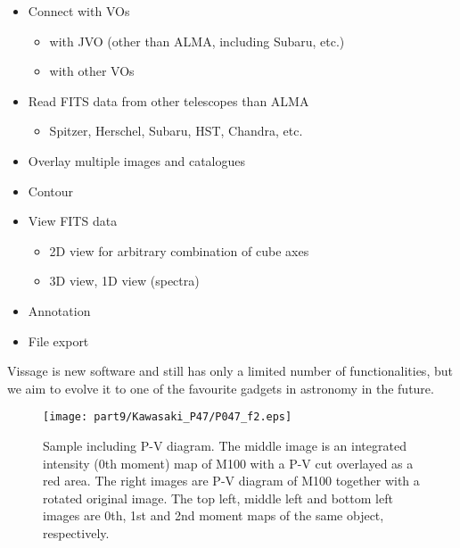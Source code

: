 \begin{itemize}
  \item Connect with VOs
    \begin{itemize}
      \item with JVO (other than ALMA, including Subaru, etc.)
      \item with other VOs
    \end{itemize}
  \item Read FITS data from other telescopes than ALMA
    \begin{itemize}
      \item {}Spitzer, Herschel, Subaru, HST, Chandra, etc.
    \end{itemize}
  \item Overlay multiple images and catalogues
  \item Contour
  \item View FITS data
    \begin{itemize}
      \item 2D view for arbitrary combination of cube axes
      \item 3D view, 1D view (spectra)
    \end{itemize}
  \item Annotation
  \item File export
\end{itemize}

Vissage is new software and still has only a limited number of functionalities, but we aim to evolve it to one of the favourite gadgets in astronomy in the future. 

\begin{figure}[tb]
  \centering
  \texttt{[image: part9/Kawasaki\_P47/P047\_f2.eps]}
  \caption{Sample including P-V diagram. The middle image is an integrated intensity (0th moment) map of M100 with a P-V cut overlayed as a red area. The right images are P-V diagram of M100 together with a rotated original image. The top left, middle left and bottom left images are 0th, 1st and 2nd moment maps of the same object, respectively.}
  \label{Kfig2}
\end{figure}


